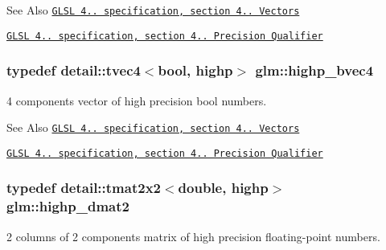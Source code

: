 \begin{DoxySeeAlso}{See Also}
\href{http://www.opengl.org/registry/doc/GLSLangSpec.4.20.8.pdf}{\tt G\-L\-S\-L 4.. specification, section 4.. Vectors} 

\href{http://www.opengl.org/registry/doc/GLSLangSpec.4.20.8.pdf}{\tt G\-L\-S\-L 4.. specification, section 4.. Precision Qualifier} 
\end{DoxySeeAlso}
\hypertarget{group__core__precision_ga381539af52c5e5c659700e12fb706eaf}{
\subsubsection[{highp\-\_\-bvec4}]{\setlength{\rightskip}{0pt plus 5cm}typedef detail\-::tvec4$<$bool, highp$>$ {\bf glm\-::highp\-\_\-bvec4}}}\label{group__core__precision_ga381539af52c5e5c659700e12fb706eaf}
4 components vector of high precision bool numbers.

\begin{DoxySeeAlso}{See Also}
\href{http://www.opengl.org/registry/doc/GLSLangSpec.4.20.8.pdf}{\tt G\-L\-S\-L 4.. specification, section 4.. Vectors} 

\href{http://www.opengl.org/registry/doc/GLSLangSpec.4.20.8.pdf}{\tt G\-L\-S\-L 4.. specification, section 4.. Precision Qualifier} 
\end{DoxySeeAlso}
\hypertarget{group__core__precision_ga9b158b3b722fe991bb66f7e65f136e68}{
\subsubsection[{highp\-\_\-dmat2}]{\setlength{\rightskip}{0pt plus 5cm}typedef detail\-::tmat2x2$<$double, highp$>$ {\bf glm\-::highp\-\_\-dmat2}}}\label{group__core__precision_ga9b158b3b722fe991bb66f7e65f136e68}
2 columns of 2 components matrix of high precision floating-\/point numbers.

